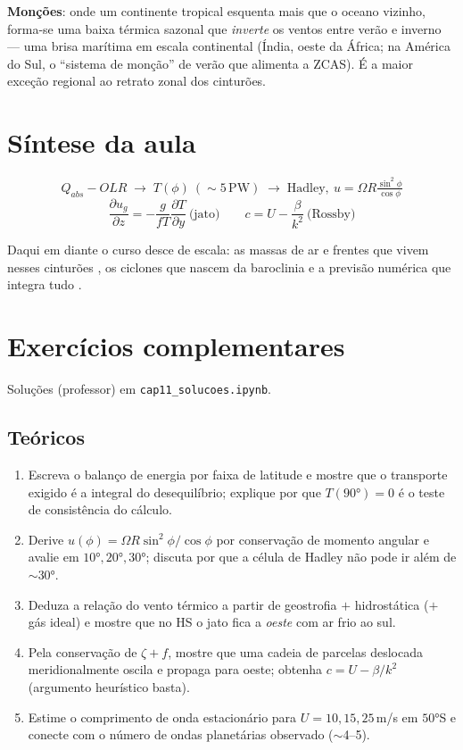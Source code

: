 \documentclass[11pt]{article}
\begin{document}
\textbf{Monções}: onde um continente tropical esquenta mais que o
oceano vizinho, forma-se uma baixa térmica sazonal que \emph{inverte}
os ventos entre verão e inverno — uma brisa marítima
 em escala continental (Índia, oeste da África;
na América do Sul, o ``sistema de monção'' de verão que alimenta a
ZCAS). É a maior exceção regional ao retrato zonal dos cinturões.

\section{Síntese da aula}

\begin{noquadro}
\[ Q_{abs} - OLR \;\to\; T(\phi)\ (\sim5\,\mathrm{PW}) \;\to\;
   \text{Hadley},\ u = \Omega R\tfrac{\sin^2\phi}{\cos\phi} \]
\[ \frac{\partial u_g}{\partial z} =
-\frac{g}{fT}\frac{\partial T}{\partial y}\ \text{(jato)}
   \qquad c = U - \frac{\beta}{k^2}\ \text{(Rossby)} \]
\end{noquadro}

Daqui em diante o curso desce de escala: as massas de ar e frentes que
vivem nesses cinturões , os ciclones
que nascem da baroclinia  e a
previsão numérica que integra tudo .

\section{Exercícios complementares}\label{sec:exercicios}

Soluções (professor) em \texttt{cap11\_solucoes.ipynb}.

\subsection*{Teóricos}

\begin{enumerate}[label=\textbf{T\arabic*.},itemsep=4pt]
  \item Escreva o balanço de energia por faixa de latitude e mostre que
        o transporte exigido é a integral do desequilíbrio; explique por
        que $T(90°) = 0$ é o teste de consistência do cálculo.
  \item Derive $u(\phi) = \Omega R\sin^2\phi/\cos\phi$ por conservação
        de momento angular e avalie em $10°, 20°, 30°$; discuta por que
        a célula de Hadley não pode ir além de $\sim$30°.
  \item Deduza a relação do vento térmico a partir de geostrofia $+$
        hidrostática ($+$ gás ideal) e mostre que no HS o jato fica a
        \emph{oeste} com ar frio ao sul.
  \item Pela conservação de $\zeta + f$, mostre que uma cadeia de
        parcelas deslocada meridionalmente oscila e propaga para oeste;
        obtenha $c = U - \beta/k^2$ (argumento heurístico basta).
  \item Estime o comprimento de onda estacionário para $U = 10, 15,
        25$\,m/s em $50°$S e conecte com o número de ondas planetárias
        observado ($\sim$4--5).
\end{enumerate}
\end{document}
